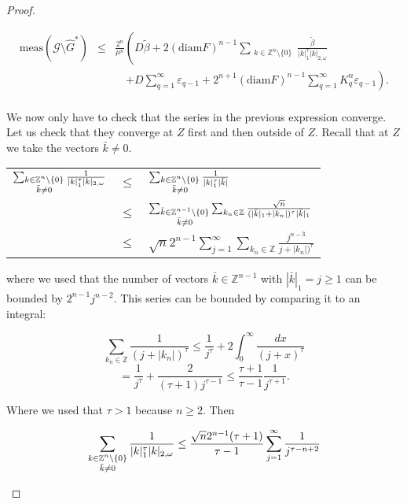 \begin{proof}
\begin{enumerate}
\begin{equation}\label{eq:final_bound}
\begin{array}{rcl}
 \text{meas}(\mathcal{G} \setminus \hat G^*) & \leq & \displaystyle \frac{2^n}{\mu^n}\left( D \tilde \beta + 2(\text{diam}F)^{n-1}\sum_{\substack{k\in\mathbb{Z}^n\setminus\{0\} \\ }}\frac{\tilde \beta}{|k|_1^\tau|k|_{2,\omega}}\right.\\
 & & \quad \displaystyle \left. + D\sum_{q=1}^\infty \varepsilon_{q-1} + 2^{n+1}(\text{diam} F)^{n-1} \sum_{q=1}^{\infty} K_q^n \varepsilon_{q-1} \right).\\
\end{array}
\end{equation}

We now only have to check that the series  in the previous expression converge. Let us check that they converge at $Z$ first and then outside of $Z$. Recall that at $Z$ we take the vectors $\bar k \neq 0$.

\begin{longtable}{rcl}
$\sum_{\substack{k\in\mathbb{Z}^n\setminus\{0\} \\ \textcolor{black}{\bar k \neq 0}}} \frac{1}{|k|_1^\tau |k|_{2,\omega}}$ & $\leq$ & $\sum_{\substack{k\in\mathbb{Z}^n\setminus\{0\} \\ \textcolor{black}{\bar k \neq 0}}} \frac{1}{|k|_1^\tau|\bar k|}$\\
 & $\leq$ & $\sum_{\substack{\bar k\in\mathbb{Z}^{n-1}\setminus\{0\} \\ \textcolor{black}{\bar k \neq 0}}}\sum_{k_n \in \mathbb{Z}} \frac{\sqrt{n}}{(|\bar k|_1 + |k_n|)^\tau|\bar k|_1}$\\
  & $\leq$ & $\sqrt{n} 2^{n-1} \sum_{j=1}^{\infty}\sum_{k_n \in \mathbb{Z}} \frac{j^{n-3}}{j + |k_n|)^\tau}$\\
\end{longtable}
where we used that the number of vectors $\bar k \in \mathbb{Z}^{n-1}$ with $|\bar k|_1 = j \geq 1$ can be bounded by $2^{n-1} j^{n-2}$. This series can be bounded by comparing it to an integral:

$$\sum_{k_n \in \mathbb{Z}} \frac{1}{(j + |k_n|)^\tau} \leq \frac{1}{j^\tau} + 2 \int_0^\infty \frac{dx}{(j+x)^\tau} $$
$$= \frac{1}{j^\tau} + \frac{2}{(\tau+1) j^{\tau-1}} \leq \frac{\tau+1}{\tau-1}\frac{1}{j^{\tau+1}}.$$

Where we used that $\tau > 1$ because $n\geq 2$. Then

$$\sum_{\substack{k\in\mathbb{Z}^{n}\setminus\{0\} \\ \textcolor{black}{\bar k \neq 0}}} \frac{1}{|k|_1^\tau|k|_{2,\omega}}\leq \frac{\sqrt{n} 2^{n-1}(\tau+1)}{\tau-1} \sum_{j=1}^\infty \frac{1}{j^{\tau-n+2}}$$


\end{enumerate}
\end{proof}
